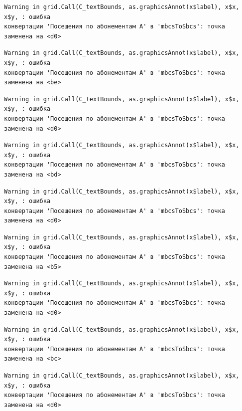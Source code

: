 \documentclass[
  letterpaper,
  DIV=11,
  numbers=noendperiod]{scrreprt}
\begin{document}
\begin{verbatim}
Warning in grid.Call(C_textBounds, as.graphicsAnnot(x$label), x$x, x$y, : ошибка
конвертации 'Посещения по абонементам А' в 'mbcsToSbcs': точка заменена на <d0>
\end{verbatim}

\begin{verbatim}
Warning in grid.Call(C_textBounds, as.graphicsAnnot(x$label), x$x, x$y, : ошибка
конвертации 'Посещения по абонементам А' в 'mbcsToSbcs': точка заменена на <be>
\end{verbatim}

\begin{verbatim}
Warning in grid.Call(C_textBounds, as.graphicsAnnot(x$label), x$x, x$y, : ошибка
конвертации 'Посещения по абонементам А' в 'mbcsToSbcs': точка заменена на <d0>
\end{verbatim}

\begin{verbatim}
Warning in grid.Call(C_textBounds, as.graphicsAnnot(x$label), x$x, x$y, : ошибка
конвертации 'Посещения по абонементам А' в 'mbcsToSbcs': точка заменена на <bd>
\end{verbatim}

\begin{verbatim}
Warning in grid.Call(C_textBounds, as.graphicsAnnot(x$label), x$x, x$y, : ошибка
конвертации 'Посещения по абонементам А' в 'mbcsToSbcs': точка заменена на <d0>
\end{verbatim}

\begin{verbatim}
Warning in grid.Call(C_textBounds, as.graphicsAnnot(x$label), x$x, x$y, : ошибка
конвертации 'Посещения по абонементам А' в 'mbcsToSbcs': точка заменена на <b5>
\end{verbatim}

\begin{verbatim}
Warning in grid.Call(C_textBounds, as.graphicsAnnot(x$label), x$x, x$y, : ошибка
конвертации 'Посещения по абонементам А' в 'mbcsToSbcs': точка заменена на <d0>
\end{verbatim}

\begin{verbatim}
Warning in grid.Call(C_textBounds, as.graphicsAnnot(x$label), x$x, x$y, : ошибка
конвертации 'Посещения по абонементам А' в 'mbcsToSbcs': точка заменена на <bc>
\end{verbatim}

\begin{verbatim}
Warning in grid.Call(C_textBounds, as.graphicsAnnot(x$label), x$x, x$y, : ошибка
конвертации 'Посещения по абонементам А' в 'mbcsToSbcs': точка заменена на <d0>
\end{verbatim}
\end{document}
